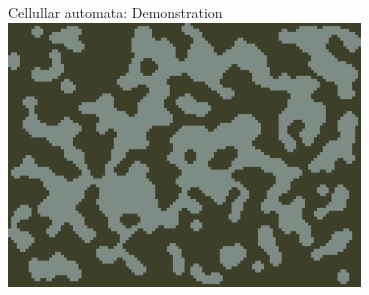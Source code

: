 \begin{frame}{Cellullar automata: Demonstration}
    \pause
    \includegraphics[height=7cm]{images/ca.png}
\end{frame}

